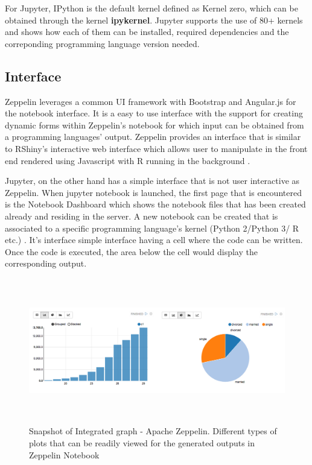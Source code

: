 \documentclass[9pt,twocolumn,twoside]{../../styles/osajnl}
\begin{document}
For Jupyter, IPython is the default kernel defined as Kernel zero, which can be obtained through the kernel \textbf{ipykernel}. Jupyter supports the use of 80+ kernels and \cite{www-jupyter-kernel} shows how each of them can be installed, required dependencies and the correponding programming language version needed.

\subsection{Interface}
Zeppelin leverages a common UI framework with Bootstrap and Angular.js for the notebook interface. It is a easy to use interface with the support for creating dynamic forms within Zeppelin's notebook for which input can be obtained from a programming languages' output. Zeppelin provides an interface that is similar to RShiny's interactive web interface which allows user to manipulate in the front end rendered using Javascript with R running in the background \cite{www-rshiny}. 

Jupyter, on the other hand has a simple interface that is not user interactive as Zeppelin. When jupyter notebook is launched, the first page that is encountered is the Notebook Dashboard which shows the notebook files that has been created already and residing in the server. A new notebook can be created that is associated to a specific programming language's kernel (Python 2/Python 3/ R etc.) \cite{www-jupyter-ui}. It's interface simple interface having a cell where the code can be written. Once the code is executed, the area below the cell would display the corresponding output.
\begin{figure}[hbt]
\begin{center}
\centering
\includegraphics[width =\linewidth,height=2.5in]{images/graph}
\caption{Snapshot of Integrated graph - Apache Zeppelin. Different types of plots that can be readily viewed for the generated outputs in Zeppelin Notebook \cite{www-zeppelin}}
\label{fig:graphZep}
\end{center}
\end{figure}
\end{document}
